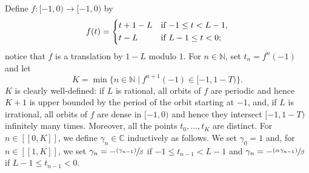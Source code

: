 \documentclass[JEP,XML,SOM,Unicode]{cedram}
\newcommand{\psfrac}[2]{\sfrac{(#1)}{#2}}
\newcommand{\llbracket}{[\![}
\newcommand{\rrbracket}{]\!]}
\theoremstyle{plain}
\theoremstyle{definition}
\newcommand{\suchthat}{\;|\:}
\begin{document}
Define $f: [-1, 0) \to [-1, 0)$ by
\[
f(t) = \begin{dcases*}
t + 1 - L& if $-1 \leq t < L - 1$,\\
t - L& if $L - 1 \leq t < 0$; 
\end{dcases*}
\]
notice that $f$ is a translation by $1 - L$ modulo $1$. For $n \in \mathbb N$, set $t_n = f^n(-1)$ and let
\[
K = \min\{n \in \mathbb N \suchthat f^{n+1}(-1) \in [-1, 1 - T)\}.
\]
$K$ is clearly well-defined: if $L$ is rational, all orbits of $f$ are periodic and hence $K+1$ is upper bounded by the period of the orbit starting at $-1$, and, if $L$ is irrational, all orbits of $f$ are dense in $[-1, 0)$ and hence they intersect $[-1, 1-T)$ infinitely many times. Moreover, all the points $t_0, \dots, t_K$ are distinct. For $n \in \llbracket 0, K\rrbracket$, we define $\gamma_n \in \mathbb C$ inductively as follows. We set $\gamma_0 = 1$ and, for $n \in \llbracket 1, K\rrbracket$, we set $\gamma_n = -\psfrac{\gamma_{n-1}}{\beta}$ if $-1 \leq t_{n-1} < L - 1$ and $\gamma_n = -\psfrac{\alpha \gamma_{n-1}}{\beta}$ if $L - 1 \leq t_{n-1} < 0$.
\end{document}
